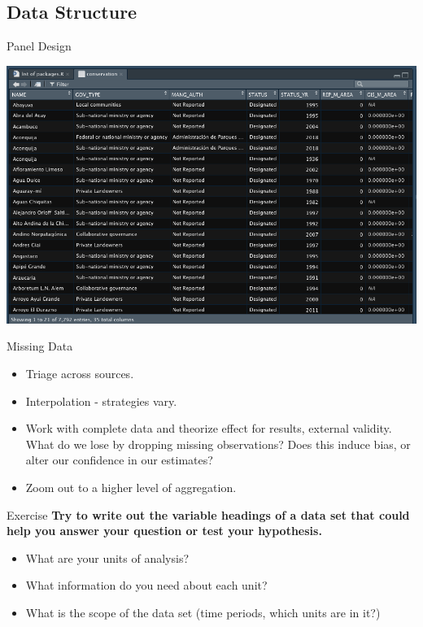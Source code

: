 \documentclass{beamer}
\begin{document}
\subsection{Data Structure}
\begin{frame}{Panel Design}
\begin{center} 
\includegraphics[width = .85\framewidth]{panel.png}
\end{center}
\end{frame}   
\begin{frame}{Missing Data}
\begin{itemize}
    \item Triage across sources. 
    \item Interpolation - strategies vary. 
    \item Work with complete data and theorize effect for results, external validity. What do we lose by dropping missing observations? Does this induce bias, or alter our confidence in our estimates? 
    \item Zoom out to a higher level of aggregation.  
\end{itemize}
\end{frame} 
\begin{frame}{Exercise}
\textbf{Try to write out the variable headings of a data set that could help you answer your question or test your hypothesis.}
\begin{itemize}
    \item What are your units of analysis?
    \item What information do you need about each unit?
    \item What is the scope of the data set (time periods, which units are in it?) 
\end{itemize}
\end{frame} 
\end{document}
